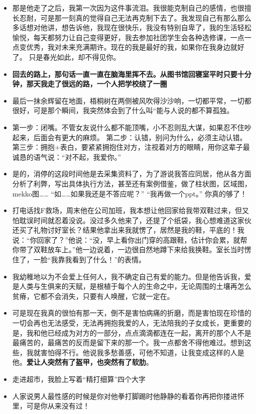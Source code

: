 \documentclass[UTF8,a4paper,8pt]{ctexbook}
\begin{document}
\begin{itemize}
			\item 那是他走了之后，我第一次因为这件事流泪。我很能克制自己的感情，也很擅长忍耐，可是那一刻真的觉得自己无法再克制下去了。我发现自己有那么那么多话想对他讲，想告诉他，我现在很快乐，我没有特别自卑了，我的生活轻松愉悦，每天都努力让自己变得更好，我去参加社团学生会各种选修课，一点一点变优秀，我对未来充满期许。现在的我是最好的我，如果你在我身边就好了。 只是春光如此，却不得见你。
			\item \textbf{回去的路上，那句话一直一直在脑海里挥不去。从图书馆回寝室平时只要十分钟，那天我走了很远的路，一个人把学校绕了一圈}
			\item 最后一抹余辉留在地面，梧桐树在两侧被风吹得沙沙响，一切都平常，一切都很好，可是那个瞬间，我突然体会到了什么叫“能与人说的都不算孤独。
			\item 第一步：闭嘴。不管女友说什么都不能顶嘴，小不忍则乱大谋，如果忍不住吵起来，后面会有更大的麻烦。 第二步：认错，别问为什么，必须主动认错。 第三步：拥抱+表白，要紧紧拥抱住对方，注视着对方的眼睛，用你这辈子最诚恳的语气说：“对不起，我爱你。”
			\item 是的，消停的这段时间他是去采集资料了，为了游说我答应同居，他从各方面分析了利弊，写出具体执行方法，甚至还有案例借鉴，做了柱状图，区域图，mekko图…… “如……如果我还是不答应呢？” “我再做一个ppt。” 你真的够了！
			\item 打电话找F救场，周末他在公司加班，我本想让他回家给我带双鞋过来，但又怕耽误时间就忍着没说。没过多久他来了，还提了个纸袋，我心想难道这家伙还买了礼物讨好室长？结果他拿出来我就愣了，居然是我的鞋，平底的！我说：“你回家了？”他说：“没，早上看你出门穿的高跟鞋，估计你会累，就帮你带了双鞋放车上。”他一边说着，一边很自然地蹲下来给我换鞋。室长当时愣住了，一脸“我靠我看到了什么！”的表情。
			\item 我幼稚地以为不会爱上任何人，我不确定自己有爱的能力。但是他告诉我，爱是人类与生俱来的天赋，是根植于每个人的生命之中，无论周围的土壤再怎么贫瘠，它都不会消失，只要有人唤醒，它就一定在。
			\item 可是现在我真的很怕有那一天，倒不是害怕病痛的折磨，而是害怕现在珍惜的一切会再也无法感受，无法再拥抱我爱的人，无法陪我的子女成长，更重要的是，我和他已经成为对方的一部分，点点滴滴都连在一起，离开的那个人不是最痛苦的，最痛苦的反而是留下来的那一个。我一点都舍不得他难过。想到这些，我就害怕得不行。他说我多愁善感，可他不知道，让我变成这样的人是他。\textbf{爱让人突然有了盔甲，也突然有了软肋}。
			\item 走进超市，我脸上写着“精打细算”四个大字
			\item 人家说男人最性感的时候是你对他拳打脚踢时他静静的看着你再把你搂进怀里，可是你从来没有过！

\end{itemize}
\end{document}
